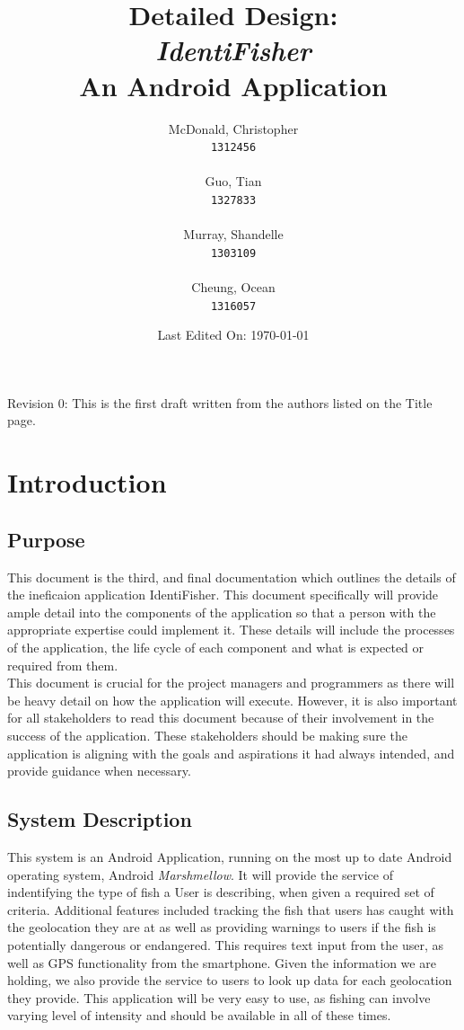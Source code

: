 \documentclass[]{article}
\title{Detailed Design: \\ \textit{IdentiFisher} \\ An Android Application \\}
\author{
\Large McDonald, Christopher\\
\texttt{1312456} \\ \\
\Large Guo, Tian\\
\texttt{1327833} \\ \\
\Large Murray, Shandelle\\
\texttt{1303109} \\ \\
\Large Cheung, Ocean\\
\texttt{1316057} \\
}
\date{Last Edited On: \today}
\begin{document}
\maketitle

\newpage

\tableofcontents
\vfill
Revision 0: This is the first draft written from the authors listed on the Title page.
\pagebreak
\section{Introduction}
\label{sec:introduction}

\subsection{Purpose}
\label{sub:purpose}

This document is the third, and final documentation which outlines the details of the ineficaion application IdentiFisher. This document specifically will provide ample detail into the components of the application so that a person with the appropriate expertise could implement it. These details will include the processes of the application, the life cycle of each component and what is expected or required from them. \\
This document is crucial for the project managers and programmers as there will be heavy detail on how the application will execute. However, it is also important for all stakeholders to read this document because of their involvement in the success of the application. These stakeholders should be making sure the application is aligning with the goals and aspirations it had always intended, and provide guidance when necessary.

\subsection{System Description}
\label{sub:system_description}

This system is an Android Application, running on the most up to date Android operating system, Android \textit{Marshmellow}. It will provide the service of indentifying the type of fish a User is describing, when given a required set of criteria. Additional features included tracking the fish that users has caught with the geolocation they are at as well as providing warnings to users if the fish is potentially dangerous or endangered. This requires text input from the user, as well as GPS functionality from the smartphone. Given the information we are holding, we also provide the service to users to look up data for each geolocation they provide. This application will be very easy to use, as fishing can involve varying level of intensity and should be available in all of these times.
\end{document}
